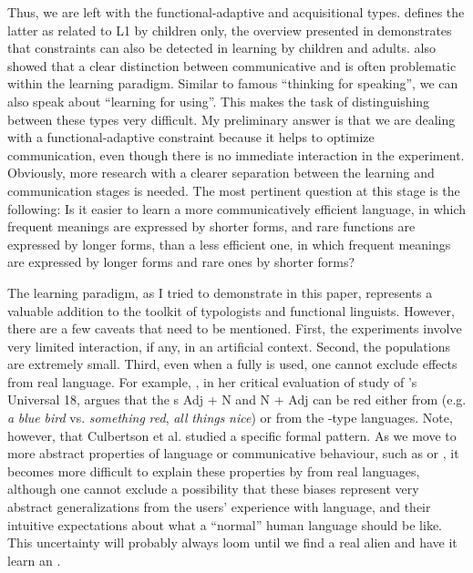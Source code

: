 \documentclass[output=paper]{langsci/langscibook}
\begin{document}
Thus, we are left with the functional-adaptive and acquisitional types.   defines the latter as related to L1 by children only,  the overview presented in  demonstrates that  constraints can also be detected in  learning by children and adults.  also showed that a clear distinction between communicative  and  is often problematic within the  learning paradigm. Similar to  famous “thinking for speaking”, we can also speak about “learning for using”. This makes the task of distinguishing between these types very difficult. My preliminary answer is that we are dealing with a functional-adaptive constraint because it helps to optimize communication, even though there is no immediate interaction in the experiment. Obviously, more research with a clearer separation between the learning and communication stages is needed. The most pertinent question at this stage is the following: Is it easier to learn a more communicatively efficient language, in which frequent meanings are expressed by shorter forms, and rare functions are expressed by longer forms, than a less efficient one, in which frequent meanings are expressed by longer forms and rare ones by shorter forms?

The  learning paradigm, as I tried to demonstrate in this paper, represents a valuable addition to the toolkit of typologists and functional linguists. However, there are a few caveats that need to be mentioned. First, the experiments involve very limited interaction, if any, in an artificial context. Second, the populations are extremely small. Third, even when a fully  is used, one cannot exclude  effects from real language. For example, \citet{Goldberg2013}, in her critical evaluation of  study of ’s Universal 18, argues that the s Adj + N and N + Adj can be red either from  (e.g. \textit{a} \textit{blue} \textit{bird} vs. \textit{something} \textit{red}, \textit{all} \textit{things} \textit{nice}) or from the -type languages. Note, however, that Culbertson et al. studied a specific formal pattern. As we move to more abstract properties of language or communicative behaviour, such as  or , it becomes more difficult to explain these properties by  from real languages, although one cannot exclude a possibility that these biases represent very abstract generalizations from the users’ experience with language, and their intuitive expectations about what a “normal” human language should be like. This uncertainty will probably always loom until we find a real alien and have it learn an . 
\end{document}
